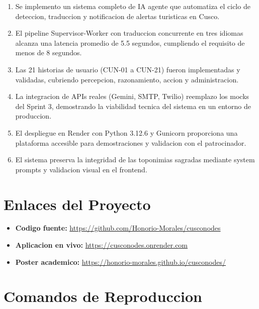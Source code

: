 \documentclass[10pt,twocolumn,a4paper]{article}
\begin{document}
\begin{enumerate}
  \item Se implemento un sistema completo de IA agente que
  automatiza el ciclo de deteccion, traduccion y notificacion de
  alertas turisticas en Cusco.
  \item El pipeline Supervisor-Worker con traduccion concurrente
  en tres idiomas alcanza una latencia promedio de 5.5 segundos,
  cumpliendo el requisito de menos de 8 segundos.
  \item Las 21 historias de usuario (CUN-01 a CUN-21) fueron
  implementadas y validadas, cubriendo percepcion, razonamiento,
  accion y administracion.
  \item La integracion de APIs reales (Gemini, SMTP, Twilio)
  reemplazo los mocks del Sprint 3, demostrando la viabilidad
  tecnica del sistema en un entorno de produccion.
  \item El despliegue en Render con Python 3.12.6 y Gunicorn
  proporciona una plataforma accesible para demostraciones y
  validacion con el patrocinador.
  \item El sistema preserva la integridad de las toponimias
  sagradas mediante system prompts y validacion visual en el
  frontend.
\end{enumerate}

\section*{Enlaces del Proyecto}

\begin{itemize}
  \item \textbf{Codigo fuente:}
  \url{https://github.com/Honorio-Morales/cusconodes}
  \item \textbf{Aplicacion en vivo:}
  \url{https://cusconodes.onrender.com}
  \item \textbf{Poster academico:}
  \url{https://honorio-morales.github.io/cusconodes/}
\end{itemize}

\section*{Comandos de Reproduccion}
\end{document}
